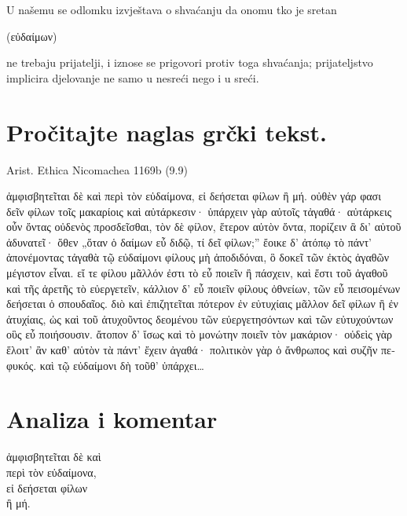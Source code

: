 U našemu se odlomku izvještava o shvaćanju da onomu tko je sretan \begin{greek}(εὐδαίμων)\end{greek} ne trebaju prijatelji, i iznose se prigovori protiv toga shvaćanja; prijateljstvo implicira djelovanje ne samo u nesreći nego i u sreći.


\section*{Pročitajte naglas grčki tekst.}

Arist. Ethica Nicomachea 1169b (9.9)


\medskip


{\large

\begin{greek}

\noindent  ἀμφισβητεῖται δὲ καὶ περὶ τὸν εὐδαίμονα, εἰ δεήσεται φίλων ἢ μή. οὐθὲν γάρ φασι δεῖν φίλων τοῖς μακαρίοις καὶ αὐτάρκεσιν· ὑπάρχειν γὰρ αὐτοῖς τἀγαθά· αὐτάρκεις οὖν ὄντας οὐδενὸς προσδεῖσθαι, τὸν δὲ φίλον, ἕτερον αὐτὸν ὄντα, πορίζειν ἃ δι' αὑτοῦ ἀδυνατεῖ· ὅθεν „ὅταν ὁ δαίμων εὖ διδῷ, τί δεῖ φίλων;” ἔοικε δ' ἀτόπῳ τὸ πάντ' ἀπονέμοντας τἀγαθὰ τῷ εὐδαίμονι φίλους μὴ ἀποδιδόναι, ὃ δοκεῖ τῶν ἐκτὸς ἀγαθῶν μέγιστον εἶναι. εἴ τε φίλου μᾶλλόν ἐστι τὸ εὖ ποιεῖν ἢ πάσχειν, καὶ ἔστι τοῦ ἀγαθοῦ καὶ τῆς ἀρετῆς τὸ εὐεργετεῖν, κάλλιον δ' εὖ ποιεῖν φίλους ὀθνείων, τῶν εὖ πεισομένων δεήσεται ὁ σπουδαῖος. διὸ καὶ ἐπιζητεῖται πότερον ἐν εὐτυχίαις μᾶλλον δεῖ φίλων ἢ ἐν ἀτυχίαις, ὡς καὶ τοῦ ἀτυχοῦντος δεομένου τῶν εὐεργετησόντων καὶ τῶν εὐτυχούντων οὓς εὖ ποιήσουσιν. ἄτοπον δ' ἴσως καὶ τὸ μονώτην ποιεῖν τὸν μακάριον· οὐδεὶς γὰρ ἕλοιτ' ἂν καθ' αὑτὸν τὰ πάντ' ἔχειν ἀγαθά· πολιτικὸν γὰρ ὁ ἄνθρωπος καὶ συζῆν πεφυκός. καὶ τῷ εὐδαίμονι δὴ τοῦθ' ὑπάρχει\dots

\end{greek}

}


\section*{Analiza i komentar}


{\large
\begin{greek}
\noindent  ἀμφισβητεῖται δὲ καὶ \\
\tabto{2em} περὶ τὸν εὐδαίμονα, \\
εἰ δεήσεται φίλων \\
\tabto{2em} ἢ μή.\\

\end{greek}
}

